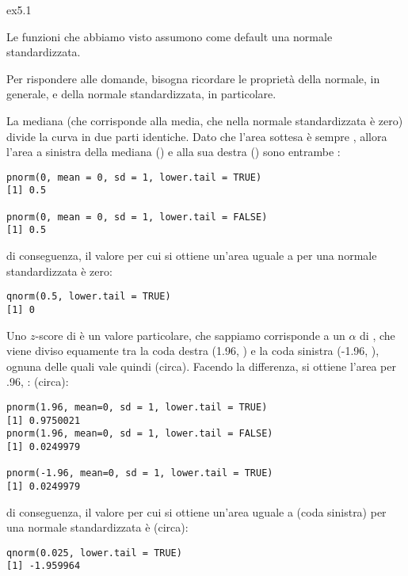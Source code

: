 \begin{solution}{ex5.1}

\noindent Le funzioni che abbiamo visto assumono come default una normale standardizzata.

\noindent Per rispondere alle domande, bisogna ricordare le propriet\`a della normale, in generale, e della normale standardizzata, in particolare.

\noindent La mediana (che corrisponde alla media, che nella normale standardizzata \`e zero) divide la curva in due parti identiche. Dato che l'area sottesa \`e sempre , allora l'area a sinistra della mediana () e alla sua destra () sono entrambe :

\begin{lstlisting}[style=Rstyle]
pnorm(0, mean = 0, sd = 1, lower.tail = TRUE)
[1] 0.5

pnorm(0, mean = 0, sd = 1, lower.tail = FALSE)
[1] 0.5
\end{lstlisting}
%
di conseguenza, il valore per cui si ottiene un'area uguale a  per una normale standardizzata \`e zero:

\begin{lstlisting}[style=Rstyle]
qnorm(0.5, lower.tail = TRUE)
[1] 0
\end{lstlisting}


\noindent Uno $z$-score di  \`e un valore particolare, che sappiamo corrisponde a un $\alpha$ di , che viene diviso equamente tra la coda destra (1.96, ) e la coda sinistra (-1.96, ), ognuna delle quali vale quindi  (circa). Facendo la differenza, si ottiene l'area per .96, :  (circa):

\begin{lstlisting}[style=Rstyle]
pnorm(1.96, mean=0, sd = 1, lower.tail = TRUE)
[1] 0.9750021
pnorm(1.96, mean=0, sd = 1, lower.tail = FALSE)
[1] 0.0249979
 
pnorm(-1.96, mean=0, sd = 1, lower.tail = TRUE)
[1] 0.0249979
\end{lstlisting}
%
di conseguenza, il valore per cui si ottiene un'area uguale a  (coda sinistra) per una normale standardizzata \`e  (circa):

\begin{lstlisting}[style=Rstyle]
qnorm(0.025, lower.tail = TRUE)
[1] -1.959964
\end{lstlisting}



\end{solution}

